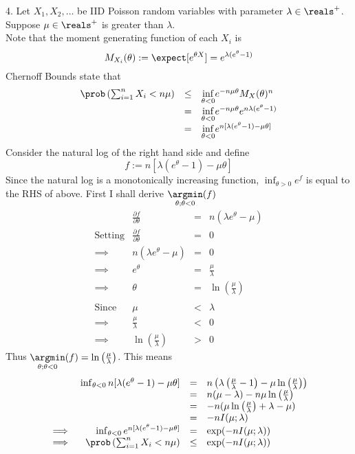 \documentclass[11pt,a4paper]{article}
\begin{document}
\begin{answer}{4.}
  Let $X_1,X_2,\dots$ be IID Poisson random variables with parameter $\lambda\in\reals^+$. Suppose $\mu\in\reals^+$ is greater than $\lambda$.\\
  Note that the moment generating function of each $X_i$ is
  \[ M_{X_i}(\theta):=\expect[e^{\theta X}]=e^{\lambda(e^\theta-1)} \]
  Chernoff Bounds state that
  \[\begin{array}{rcl}
    \prob\left(\sum_{i=1}^nX_i<n\mu\right)&\leq&\underset{\theta<0}\inf e^{-n\mu\theta}M_X(\theta)^n\\
    &=&\underset{\theta<0}\inf e^{-n\mu\theta}e^{n\lambda(e^\theta-1)}\\
    &=&\underset{\theta<0}\inf e^{n[\lambda(e^\theta-1)-\mu\theta]}
  \end{array}\]
  Consider the natural log of the right hand side and define
  \[ f:=n[\lambda(e^\theta-1)-\mu\theta] \]
  Since the natural log is a monotonically increasing function, $\inf_{\theta>0}e^f$ is equal to the RHS of above. First I shall derive $\underset{\theta;\theta<0}\argmin(f)$
  \[\begin{array}{rrcl}
    &\frac{\partial f}{\partial \theta}&=&n(\lambda e^\theta-\mu)\\
    \text{Setting}&\frac{\partial f}{\partial \theta}&=&0\\
    \implies&n(\lambda e^\theta-\mu)&=&0\\
    \implies&e^\theta&=&\frac\mu\lambda\\
    \implies&\theta&=&\ln\left(\frac\mu\lambda\right)\\\\
    \text{Since}&\mu&<&\lambda\\
    \implies&\frac\mu\lambda&<&0\\
    \implies&\ln\left(\frac\mu\lambda\right)&>&0
  \end{array}\]
  Thus $\underset{\theta;\theta<0}\argmin(f)=\ln\left(\frac\mu\lambda\right)$. This means
  \[\begin{array}{rrcl}
    &\inf_{\theta<0}n[\lambda(e^\theta-1)-\mu\theta]&=&n\left(\lambda\left(\frac\mu\lambda-1\right)-\mu\ln\left(\frac\mu\lambda\right)\right)\\
    &&=&n(\mu-\lambda)-n\mu\ln\left(\frac\mu\lambda\right)\\
    &&=&-n(\mu\ln\left(\frac\mu\lambda\right)+\lambda-\mu)\\
    &&=&-nI(\mu;\lambda)\\
    \implies&\inf_{\theta<0}e^{n[\lambda(e^\theta-1)-\mu\theta]}&=&\exp(-nI(\mu;\lambda))\\
    \implies&\prob\left(\sum_{i=1}^nX_i<n\mu\right)&\leq&\exp(-nI(\mu;\lambda))
  \end{array}\]
\end{answer}
\end{document}

